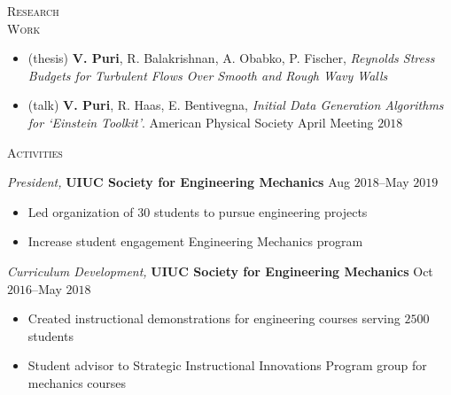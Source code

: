 \documentclass[10pt]{article}
\begin{document}
\begin{multicols}{2}
\textsc{Research \\ Work}
\columnbreak

\vspace{-1.75em}
\begin{itemize}[label= ]
    \setlength{\itemindent}{-2.5em}
    \setlength\itemsep{-1.0\itemsep}
    \item (thesis) \textbf{V. Puri}, R. Balakrishnan, A. Obabko, P. Fischer, \textit{Reynolds Stress Budgets for Turbulent Flows Over Smooth and Rough Wavy Walls}
    \item (talk) \textbf{V. Puri}, R. Haas, E. Bentivegna, \textit{Initial Data Generation Algorithms for `Einstein Toolkit'}. American Physical Society April Meeting $2018$
\end{itemize}
\vspace{-2.0em}

\end{multicols}
\vspace{-1.5em}
\begin{multicols}{2}
\textsc{Activities}
\columnbreak

\textit{President,} \textbf{UIUC Society for Engineering Mechanics} \hfill Aug $2018$--May $2019$

\vspace{-1.75em}
\begin{itemize}[label=-]
    \setlength\itemsep{-0.25em}
    \setlength{\itemindent}{-1.50em}
    \item Led organization of $30$ students to pursue engineering projects
    \item Increase student engagement Engineering Mechanics program %
\end{itemize}
\vspace{-2.0em}

\vspace{0.5em}
%
\textit{Curriculum Development,} \textbf{UIUC Society for Engineering Mechanics} \hfill Oct $2016$--May $2018$

\vspace{-1.75em}
\begin{itemize}[label=-]
    \setlength\itemsep{-0.25em}
    \setlength{\itemindent}{-1.50em}
    \item Created instructional demonstrations for engineering courses serving $2500$ students
    \item Student advisor to Strategic Instructional Innovations Program group for mechanics courses
\end{itemize}
\vspace{-2.0em}

\end{multicols}
\end{document}
